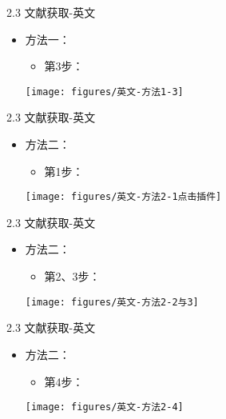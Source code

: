 \documentclass{beamer}%
\begin{document}
\begin{frame}[t]{2.3 文献获取-英文}
\begin{itemize}
  \item 方法一：
\begin{itemize}
\item 第3步：
\end{itemize}
\begin{center}
		\texttt{[image: figures/英文-方法1-3]}
\end{center}
\end{itemize}
\end{frame}

\begin{frame}[t]{2.3 文献获取-英文}
\begin{itemize}
  \item 方法二：
\begin{itemize}
\item 第1步：
\end{itemize}
\begin{center}
		\texttt{[image: figures/英文-方法2-1点击插件]}
\end{center}
\end{itemize}
\end{frame}

\begin{frame}[t]{2.3 文献获取-英文}
\begin{itemize}
  \item 方法二：
\begin{itemize}
\item 第2、3步：
\end{itemize}
\begin{center}
		\texttt{[image: figures/英文-方法2-2与3]}
\end{center}
\end{itemize}
\end{frame}

\begin{frame}[t]{2.3 文献获取-英文}
\begin{itemize}
  \item 方法二：
\begin{itemize}
\item 第4步：
\end{itemize}
\begin{center}
		\texttt{[image: figures/英文-方法2-4]}
\end{center}
\end{itemize}
\end{frame}
\end{document}
